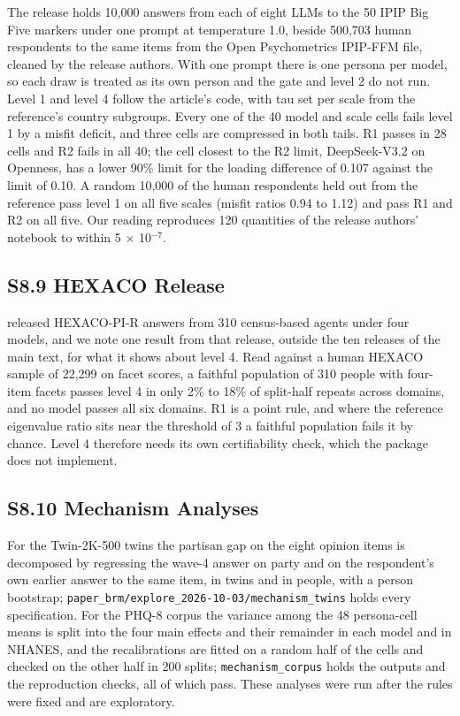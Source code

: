 The release \citep{ipipaudit2026} holds 10,000 answers from each of eight LLMs to the 50 IPIP Big Five markers under one prompt at temperature 1.0, beside 500,703 human respondents to the same items from the Open Psychometrics IPIP-FFM file, cleaned by the release authors.
With one prompt there is one persona per model, so each draw is treated as its own person and the gate and level 2 do not run.
Level 1 and level 4 follow the article's code, with tau set per scale from the reference's country subgroups.
Every one of the 40 model and scale cells fails level 1 by a misfit deficit, and three cells are compressed in both tails.
R1 passes in 28 cells and R2 fails in all 40; the cell closest to the R2 limit, DeepSeek-V3.2 on Openness, has a lower 90\% limit for the loading difference of 0.107 against the limit of 0.10.
A random 10,000 of the human respondents held out from the reference pass level 1 on all five scales (misfit ratios 0.94 to 1.12) and pass R1 and R2 on all five.
Our reading reproduces 120 quantities of the release authors' notebook to within 5 $\times$ 10$^{-7}$.

\subsection*{S8.9 HEXACO Release}

\citet{mercer2025hexaco} released HEXACO-PI-R answers from 310 census-based agents under four models, and we note one result from that release, outside the ten releases of the main text, for what it shows about level 4.
Read against a human HEXACO sample of 22,299 on facet scores, a faithful population of 310 people with four-item facets passes level 4 in only 2\% to 18\% of split-half repeats across domains, and no model passes all six domains.
R1 is a point rule, and where the reference eigenvalue ratio sits near the threshold of 3 a faithful population fails it by chance.
Level 4 therefore needs its own certifiability check, which the package does not implement.

\subsection*{S8.10 Mechanism Analyses}

For the Twin-2K-500 twins the partisan gap on the eight opinion items is decomposed by regressing the wave-4 answer on party and on the respondent's own earlier answer to the same item, in twins and in people, with a person bootstrap; \texttt{paper\_brm/explore\_2026-10-03/mechanism\_twins} holds every specification.
For the PHQ-8 corpus the variance among the 48 persona-cell means is split into the four main effects and their remainder in each model and in NHANES, and the recalibrations are fitted on a random half of the cells and checked on the other half in 200 splits; \texttt{mechanism\_corpus} holds the outputs and the reproduction checks, all of which pass.
These analyses were run after the rules were fixed and are exploratory.

